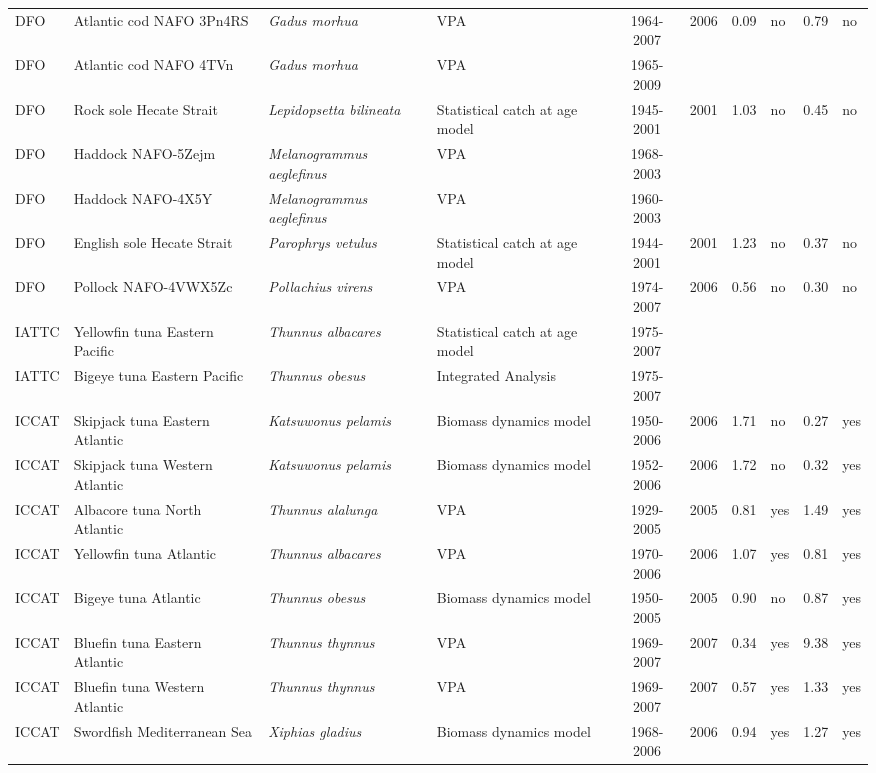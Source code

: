 \begin{longtable}{p{1.8cm}p{3.5cm}p{3.5cm}p{3cm}cccp{0.9cm}cp{0.9cm}}
  DFO & Atlantic cod NAFO 3Pn4RS & \textit{Gadus morhua} & VPA & 1964-2007 & 2006 & 0.09 & no & 0.79 & no \\ 
  DFO & Atlantic cod NAFO 4TVn & \textit{Gadus morhua} & VPA & 1965-2009 &  &  &  &  &  \\ 
  DFO & Rock sole Hecate Strait & \textit{Lepidopsetta bilineata} & Statistical catch at age model & 1945-2001 & 2001 & 1.03 & no & 0.45 & no \\ 
  DFO & Haddock NAFO-5Zejm & \textit{Melanogrammus aeglefinus} & VPA & 1968-2003 &  &  &  &  &  \\ 
  DFO & Haddock NAFO-4X5Y & \textit{Melanogrammus aeglefinus} & VPA & 1960-2003 &  &  &  &  &  \\ 
  DFO & English sole Hecate Strait & \textit{Parophrys vetulus} & Statistical catch at age model & 1944-2001 & 2001 & 1.23 & no & 0.37 & no \\ 
  DFO & Pollock NAFO-4VWX5Zc & \textit{Pollachius virens} & VPA & 1974-2007 & 2006 & 0.56 & no & 0.30 & no \\ 
  IATTC & Yellowfin tuna Eastern Pacific & \textit{Thunnus albacares} & Statistical catch at age model & 1975-2007 &  &  &  &  &  \\ 
  IATTC & Bigeye tuna Eastern Pacific & \textit{Thunnus obesus} & Integrated Analysis & 1975-2007 &  &  &  &  &  \\ 
  ICCAT & Skipjack tuna Eastern Atlantic & \textit{Katsuwonus pelamis} & Biomass dynamics model & 1950-2006 & 2006 & 1.71 & no & 0.27 & yes \\ 
  ICCAT & Skipjack tuna Western Atlantic & \textit{Katsuwonus pelamis} & Biomass dynamics model & 1952-2006 & 2006 & 1.72 & no & 0.32 & yes \\ 
  ICCAT & Albacore tuna North Atlantic & \textit{Thunnus alalunga} & VPA & 1929-2005 & 2005 & 0.81 & yes & 1.49 & yes \\ 
  ICCAT & Yellowfin tuna Atlantic & \textit{Thunnus albacares} & VPA & 1970-2006 & 2006 & 1.07 & yes & 0.81 & yes \\ 
  ICCAT & Bigeye tuna Atlantic & \textit{Thunnus obesus} & Biomass dynamics model & 1950-2005 & 2005 & 0.90 & no & 0.87 & yes \\ 
  ICCAT & Bluefin tuna Eastern Atlantic & \textit{Thunnus thynnus} & VPA & 1969-2007 & 2007 & 0.34 & yes & 9.38 & yes \\ 
  ICCAT & Bluefin tuna Western Atlantic & \textit{Thunnus thynnus} & VPA & 1969-2007 & 2007 & 0.57 & yes & 1.33 & yes \\ 
  ICCAT & Swordfish Mediterranean Sea & \textit{Xiphias gladius} & Biomass dynamics model & 1968-2006 & 2006 & 0.94 & yes & 1.27 & yes \\ 

\end{longtable}
